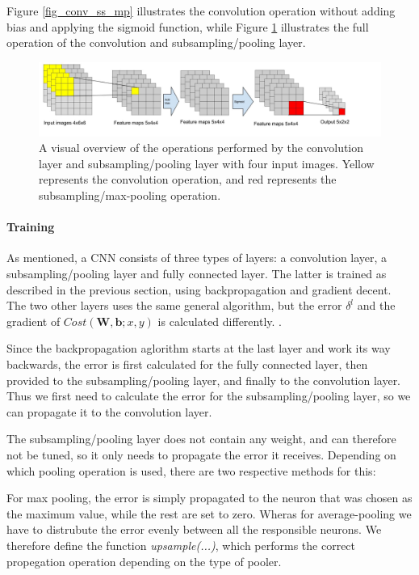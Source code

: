 Figure \ref{fig_conv_ss_mp} illustrates the convolution operation without adding bias and applying the sigmoid function, while Figure \ref{fig_visual_conv_ss_mp} illustrates the full operation of the convolution and subsampling/pooling layer. 

\begin{figure}[h!]
  \centering
      \includegraphics[width=1.3\textwidth]{Figures/Method/Convolution_subsample_pool}
  \caption{A visual overview of the operations performed by the convolution layer and subsampling/pooling layer with four input images. Yellow represents the convolution operation, and red represents the subsampling/max-pooling operation.}
  \label{fig_visual_conv_ss_mp}
\end{figure}



\paragraph{Training} \hfill \break
As mentioned, a CNN consists of three types of layers: a convolution layer, a subsampling/pooling layer and fully connected layer. The latter is trained as described in the previous section, using backpropagation and gradient decent. The two other layers uses the same general algorithm, but the error $ \delta^l $ and the gradient of $ Cost(\mathbf{W,b}; x, y) $ is calculated differently. . 

Since the backpropagation aglorithm starts at the last layer and work its way backwards, the error is first calculated for the fully connected layer, then provided to the subsampling/pooling layer, and finally to the convolution layer. Thus we first need to calculate the error for the subsampling/pooling layer, so we can propagate it to the convolution layer. 

The subsampling/pooling layer does not contain any weight, and can therefore not be tuned, so it only needs to propagate the error it receives. Depending on which pooling operation is used, there are two respective methods for this:

For max pooling, the error is simply propagated to the neuron that was chosen as the maximum value, while the rest are set to zero. Wheras for average-pooling we have to distrubute the error evenly between all the responsible neurons. We therefore define the function \textit{upsample(...)}, which performs the correct propegation operation depending on the type of pooler. 

